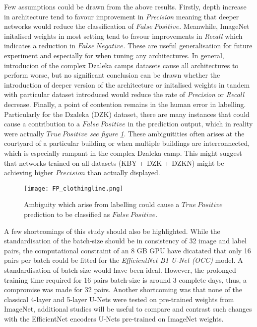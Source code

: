 \documentclass[11pt, a4paper, twoside]{report}
\begin{document}
Few assumptions could be drawn from the above results. Firstly, depth increase in architecture tend to favour improvement in \textit{Precision} meaning that deeper networks would reduce the classification of $False\ Positive$. Meanwhile, ImageNet initalised weights in most setting tend to favour improvements in \textit{Recall} which indicates a reduction in $False\ Negative$. These are useful generalisation for future experiment and especially for when tuning any architectures. In general, introducion of the complex Dzaleka camps datasets cause all architectures to perform worse, but no significant conclusion can be drawn whether the introduction of deeper version of the architecture or initalised weights in tandem with particular dataset introduced would reduce the rate of \textit{Precision} or \textit{Recall} decrease. Finally, a point of contention remains in the human error in labelling. Particularly for the Dzaleka (DZK) dataset, there are many instances that could cause a contribution to a $False\ Positive$ in the prediction output, which in reality were actually $True\ Positive$ \textit{see figure \ref{fig:ambiguity}}. These ambiguitities often arises at the courtyard of a particular building or when multiple buildings are interconnected, which is especially rampant in the complex Dzaleka camp. This might suggest that networks trained on all datasets (KBY + DZK + DZKN) might be achieving higher $Precision$ than actually displayed.\\\par

\begin{figure}[H]
  \centering
  \texttt{[image: FP\_clothingline.png]}
  \caption{Ambiguity which arise from labelling could cause a $True\ Positive$ prediction to be classified as $False\ Positive$.}
  \label{fig:ambiguity}
\end{figure}

A few shortcomings of this study should also be highlighted. While the standardisation of the batch-size should be in consistency of 32 image and label pairs, the computational constraint of an 8 GB GPU have dicatated that only 16 pairs per batch could be fitted for the \textit{EfficientNet B1 U-Net (OCC)} model. A standardisation of batch-size would have been ideal. However, the prolonged training time required for 16 pairs batch-size is around 3 complete days, thus, a compromise was made for 32 pairs. Another shortcoming was that none of the classical 4-layer and 5-layer U-Nets were tested on pre-trained weights from ImageNet, additional studies will be useful to compare and contrast such changes with the EfficientNet encoders U-Nets pre-trained on ImageNet weights.\\\par
\end{document}
